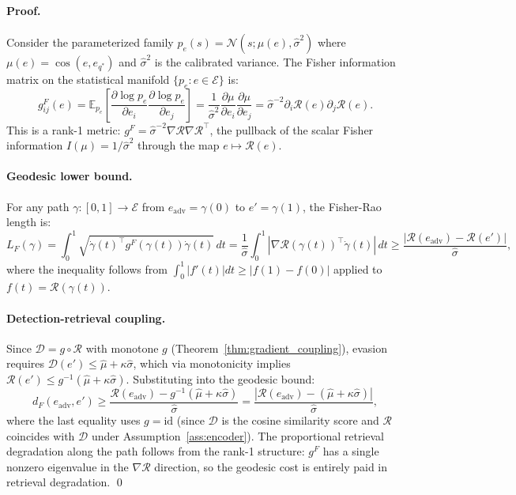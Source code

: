 \documentclass{article}
\theoremstyle{definition}
\newcommand{\EE}{\mathbb{E}}
\newcommand{\cR}{\mathcal{R}}
\newcommand{\cD}{\mathcal{D}}
\newcommand{\cN}{\mathcal{N}}
\newcommand{\cE}{\mathcal{E}}
\DeclareMathOperator{\cosim}{cos}
\begin{document}
\paragraph{Proof.} Consider the parameterized family $p_e(s) = \cN(s; \mu(e), \hat{\sigma}^2)$ where $\mu(e) = \cosim(e, e_{q^*})$ and $\hat{\sigma}^2$ is the calibrated variance. The Fisher information matrix on the statistical manifold $\{p_e : e \in \cE\}$ is:
\begin{equation}
  g_{ij}^F(e) = \EE_{p_e}\!\left[\frac{\partial \log p_e}{\partial e_i} \frac{\partial \log p_e}{\partial e_j}\right] = \frac{1}{\hat{\sigma}^2} \frac{\partial \mu}{\partial e_i} \frac{\partial \mu}{\partial e_j} = \hat{\sigma}^{-2} \partial_i \cR(e) \partial_j \cR(e).
\end{equation}
This is a rank-1 metric: $g^F = \hat{\sigma}^{-2} \nabla\cR \nabla\cR^\top$, the pullback of the scalar Fisher information $I(\mu) = 1/\hat{\sigma}^2$ through the map $e \mapsto \cR(e)$.

\paragraph{Geodesic lower bound.} For any path $\gamma: [0,1] \to \cE$ from $e_{\text{adv}} = \gamma(0)$ to $e' = \gamma(1)$, the Fisher-Rao length is:
\begin{equation}
  L_F(\gamma) = \int_0^1 \sqrt{\dot{\gamma}(t)^\top g^F(\gamma(t)) \dot{\gamma}(t)}\, dt = \frac{1}{\hat{\sigma}} \int_0^1 |\nabla\cR(\gamma(t))^\top \dot{\gamma}(t)|\, dt \geq \frac{|\cR(e_{\text{adv}}) - \cR(e')|}{\hat{\sigma}},
\end{equation}
where the inequality follows from $\int_0^1 |f'(t)| dt \geq |f(1) - f(0)|$ applied to $f(t) = \cR(\gamma(t))$.

\paragraph{Detection-retrieval coupling.} Since $\cD = g \circ \cR$ with monotone $g$ (Theorem~\ref{thm:gradient_coupling}), evasion requires $\cD(e') \leq \hat{\mu} + \kappa\hat{\sigma}$, which via monotonicity implies $\cR(e') \leq g^{-1}(\hat{\mu} + \kappa\hat{\sigma})$. Substituting into the geodesic bound:
\begin{equation}
  d_F(e_{\text{adv}}, e') \geq \frac{\cR(e_{\text{adv}}) - g^{-1}(\hat{\mu} + \kappa\hat{\sigma})}{\hat{\sigma}} = \frac{|\cR(e_{\text{adv}}) - (\hat{\mu} + \kappa\hat{\sigma})|}{\hat{\sigma}},
\end{equation}
where the last equality uses $g = \text{id}$ (since $\cD$ is the cosine similarity score and $\cR$ coincides with $\cD$ under Assumption~\ref{ass:encoder}). The proportional retrieval degradation along the path follows from the rank-1 structure: $g^F$ has a single nonzero eigenvalue in the $\nabla\cR$ direction, so the geodesic cost is entirely paid in retrieval degradation. \qed
\end{document}
